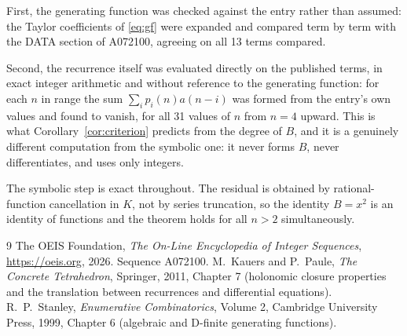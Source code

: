 \documentclass[11pt,a4paper]{article}
\theoremstyle{plain}
\theoremstyle{definition}
\begin{document}
First, the generating function was checked against the entry rather than assumed: the
Taylor coefficients of \eqref{eq:gf} were expanded and compared term by term with the DATA
section of A072100, agreeing on all 13 terms compared.

Second, the recurrence itself was evaluated directly on the published terms, in exact
integer arithmetic and without reference to the generating function: for each $n$ in range
the sum $\sum_{i}p_{i}(n)a(n-i)$ was formed from the entry's own values and found to
vanish, for all 31 values of $n$ from $n=4$ upward. This is what
Corollary~\ref{cor:criterion} predicts from the degree of $B$, and it is a genuinely
different computation from the symbolic one: it never forms $B$, never differentiates, and
uses only integers.

The symbolic step is exact throughout. The residual is obtained by rational-function
cancellation in $K$, not by series truncation, so the identity $B=x^{2}$ is an
identity of functions and the theorem holds for all $n>2$ simultaneously.

\begin{thebibliography}{9}
 The OEIS Foundation, \emph{The On-Line Encyclopedia of Integer Sequences},
\url{https://oeis.org}, 2026. Sequence A072100.
 M.~Kauers and P.~Paule, \emph{The Concrete Tetrahedron}, Springer, 2011,
Chapter 7 (holonomic closure properties and the translation between recurrences and
differential equations).
 R.~P.~Stanley, \emph{Enumerative Combinatorics}, Volume 2, Cambridge
University Press, 1999, Chapter 6 (algebraic and D-finite generating functions).
\end{thebibliography}
\end{document}
